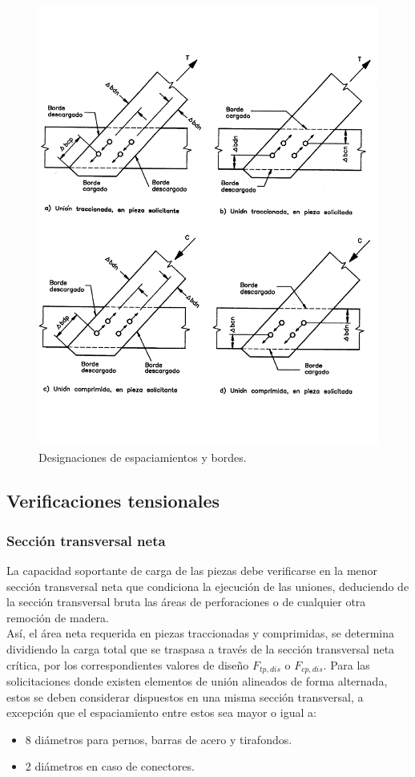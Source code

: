\begin{figure}[p]
\centering
\includegraphics[width=1\linewidth, angle=1,origin=c]{Imagenes/figura_17.pdf}
\caption{Designaciones de espaciamientos y bordes. \cite{nch1198}}
\label{fig:nch_17}
\end{figure}

\subsection{Verificaciones tensionales}
\subsubsection{Sección transversal neta}
La capacidad soportante de carga de las piezas debe verificarse en la menor sección transversal neta que condiciona la ejecución de las uniones, deduciendo de la sección transversal bruta las áreas de perforaciones o de cualquier otra remoción de madera.\\
Así, el área neta requerida en piezas traccionadas y comprimidas, se determina dividiendo la carga total que se traspasa a través de la sección transversal neta crítica, por los correspondientes valores de diseño $F_{tp,dis} $ o $F_{cp,dis}$. Para las solicitaciones donde existen elementos de unión alineados de forma alternada, estos se deben considerar dispuestos en una misma sección transversal, a excepción que el espaciamiento entre estos sea mayor o igual a:
\begin{itemize}
	\item 8 diámetros para pernos, barras de acero y tirafondos.
	\item 2 diámetros en caso de conectores.
\end{itemize}

